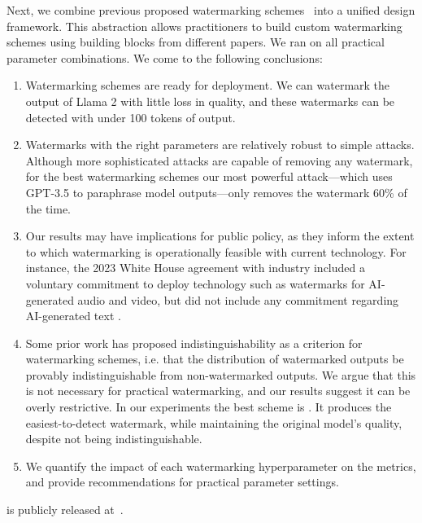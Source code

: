 Next, we combine previous proposed watermarking schemes~\citep{kirchenbauer_watermark_2023, aaronson_watermarking_2022, christ_undetectable_2023, kuditipudi_robust_2023} into a unified design framework. 
This abstraction allows practitioners to build custom watermarking schemes using building blocks from different papers. We ran \benchmarkname{} on all practical parameter combinations. We come to the following conclusions:
%
\begin{enumerate}
    \item Watermarking schemes are ready for deployment. We can watermark the output of Llama 2 with little loss in quality, and these watermarks can be detected with under 100 tokens of output.
    \item Watermarks with the right parameters are relatively robust to simple attacks. Although more sophisticated attacks are capable of removing any watermark, for the best watermarking schemes our most powerful attack---which uses GPT-3.5 to paraphrase model outputs---only removes the watermark 60\% of the time.
    \item Our results may have implications for public policy, as they inform the extent to which watermarking is operationally feasible with current technology.
    For instance, the 2023 White House agreement with industry included a voluntary commitment to deploy technology such as watermarks for AI-generated audio and video, but did not include any commitment regarding AI-generated text \cite{whitehouse23vol}.
    \item Some prior work has proposed indistinguishability as a criterion for watermarking schemes, i.e. that the distribution of watermarked outputs be provably indistinguishable from non-watermarked outputs.  We argue that this is not necessary for practical watermarking, and our results suggest it can be overly restrictive.  In our experiments the best scheme is  \citep{kirchenbauer_watermark_2023}.  It produces the easiest-to-detect watermark, while maintaining the original model's quality, despite not being indistinguishable. 
    \item We quantify the impact of each watermarking hyperparameter on the metrics, and provide recommendations for practical parameter settings.
  \end{enumerate}
%
\benchmarkname{} is publicly released at~.


